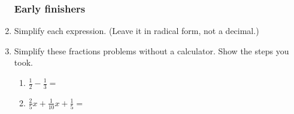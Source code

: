 \documentclass[12pt, twoside]{article}
\begin{document}
\begin{enumerate}
\subsubsection*{Early finishers}
\item Simplify each expression. (Leave it in radical form, not a decimal.)
\begin{enumerate}
\end{enumerate}
\vspace{2cm}

\item Simplify these fractions problems without a calculator. Show the steps you took.
  \begin{multicols}{2}
    \begin{enumerate}
      \item   $\displaystyle \frac{1}{2} - \frac{1}{3}=$ \vspace{6cm}
      \item   $\displaystyle \frac{2}{5}x+\frac{1}{10}x+\frac{1}{5}=$  \vspace{6cm}
    \end{enumerate}
  \end{multicols}

\end{enumerate}
\end{document}
